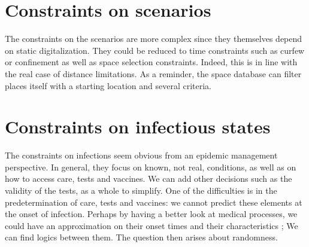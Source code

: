 \section{Constraints on scenarios}

The constraints on the scenarios are more complex since they themselves depend on static digitalization. They could be reduced to time constraints such as curfew or confinement as well as space selection constraints. Indeed, this is in line with the real case of distance limitations. As a reminder, the space database can filter places itself with a starting location and several criteria.

\section{Constraints on infectious states}

The constraints on infections seem obvious from an epidemic management perspective. In general, they focus on known, not real, conditions, as well as on how to access care, tests and vaccines. We can add other decisions such as the validity of the tests, as a whole to simplify. One of the difficulties is in the predetermination of care, tests and vaccines: we cannot predict these elements at the onset of infection. Perhaps by having a better look at medical processes, we could have an approximation on their onset times and their characteristics ; We can find logics between them. The question then arises about randomness.